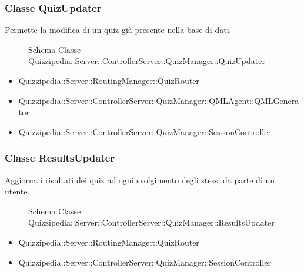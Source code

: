 \subsubsection{Classe QuizUpdater}
Permette la modifica di un quiz già presente nella base di dati.
\begin{figure}[H]
\centering
\noindent{}
\caption[Schema Classe QuizUpdater]{Schema Classe Quizzipedia::Server::ControllerServer::QuizManager::QuizUpdater}
\end{figure}
\begin{itemize}
\item Quizzipedia::Server::RoutingManager::QuizRouter
\end{itemize}
\begin{itemize}
\item Quizzipedia::Server::ControllerServer::QuizManager::QMLAgent::QMLGenerator
\item Quizzipedia::Server::ControllerServer::QuizManager::SessionController
\end{itemize}
\subsubsection{Classe ResultsUpdater}
Aggiorna i risultati dei quiz ad ogni svolgimento degli stessi da parte di un utente.
\begin{figure}[H]
\centering
\noindent{}
\caption[Schema Classe ResultsUpdater]{Schema Classe Quizzipedia::Server::ControllerServer::QuizManager::ResultsUpdater}
\end{figure}
\begin{itemize}
\item Quizzipedia::Server::RoutingManager::QuizRouter
\end{itemize}
\begin{itemize}
\item Quizzipedia::Server::ControllerServer::QuizManager::SessionController
\end{itemize}
